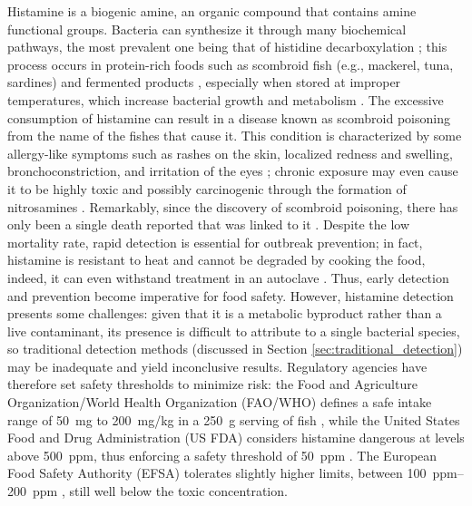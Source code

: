 Histamine is a biogenic amine, \ie{} an organic compound that contains amine functional groups. Bacteria can synthesize it through many biochemical pathways, the most prevalent one being that of histidine decarboxylation \citep{maijalaEffect1993}; this process occurs in protein-rich foods such as scombroid fish (e.g., mackerel, tuna, sardines) \citep{halsteadFish1964} and fermented products \citep{spanoBiogenic2010, pretiFast2015}, especially when stored at improper temperatures, which increase bacterial growth and metabolism \citep{landeteUpdated2008}. The excessive consumption of histamine can result in a disease known as scombroid poisoning from the name of the fishes that cause it. This condition is characterized by some allergy-like symptoms such as rashes on the skin, localized redness and swelling, bronchoconstriction, and irritation of the eyes \citep{ozogulBiogenic2019, taylorHistamine1986}; chronic exposure may even cause it to be highly toxic and possibly carcinogenic through the formation of nitrosamines \citep{bartschRelevance1984}. Remarkably, since the discovery of scombroid poisoning, there has only been a single death reported that was linked to it \citep{taylorHistamine1989}. Despite the low mortality rate, rapid detection is essential for outbreak prevention; in fact, histamine is resistant to heat and cannot be degraded by cooking the food, indeed, it can even withstand treatment in an autoclave \citep{efsaScientific2015}. Thus, early detection and prevention become imperative for food safety. However, histamine detection presents some challenges: given that it is a metabolic byproduct rather than a live contaminant, its presence is difficult to attribute to a single bacterial species, so traditional detection methods (discussed in Section \ref{sec:traditional_detection}) may be inadequate and yield inconclusive results. Regulatory agencies have therefore set safety thresholds to minimize risk: the Food and Agriculture Organization/World Health Organization (FAO/WHO) defines a safe intake range of \SI{50}{mg} to \SI{200}{mg/kg} in a \SI{250}{g} serving of fish \citep{faowhoJoint2012}, while the United States Food and Drug Administration (US FDA) considers histamine dangerous at levels above \SI{500}{ppm}, thus enforcing a safety threshold of \SI{50}{ppm} \citep{fdaFish2022}. The European Food Safety Authority (EFSA) tolerates slightly higher limits, between \SIrange{100}{200}{ppm} \citep{strokaEquivalence2014}, still well below the toxic concentration.

